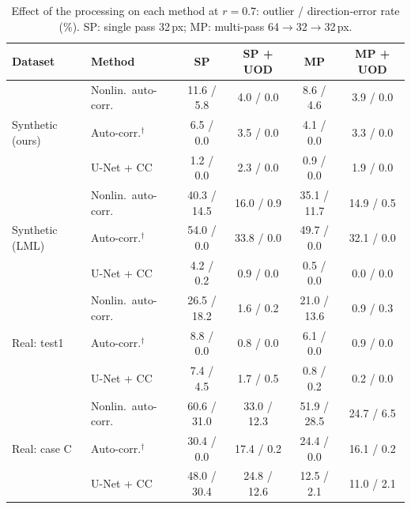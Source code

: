 \begin{table}[t]
\centering
\caption{Effect of the processing on each method at $r=0.7$: outlier / direction-error rate (\%). SP: single pass 32\,px; MP: multi-pass 64$\to$32$\to$32\,px.}
\label{tab:process}
\small
\begin{tabular}{llcccc}
\toprule
Dataset & Method & SP & SP + UOD & MP & MP + UOD \\
\midrule
\multirow{3}{*}{Synthetic (ours)} & Nonlin.\ auto-corr. & 11.6 / 5.8 & 4.0 / 0.0 & 8.6 / 4.6 & 3.9 / 0.0 \\
 & Auto-corr.$^\dagger$ & 6.5 / 0.0 & 3.5 / 0.0 & 4.1 / 0.0 & 3.3 / 0.0 \\
 & U-Net + CC & 1.2 / 0.0 & 2.3 / 0.0 & 0.9 / 0.0 & 1.9 / 0.0 \\
\midrule
\multirow{3}{*}{Synthetic (LML)} & Nonlin.\ auto-corr. & 40.3 / 14.5 & 16.0 / 0.9 & 35.1 / 11.7 & 14.9 / 0.5 \\
 & Auto-corr.$^\dagger$ & 54.0 / 0.0 & 33.8 / 0.0 & 49.7 / 0.0 & 32.1 / 0.0 \\
 & U-Net + CC & 4.2 / 0.2 & 0.9 / 0.0 & 0.5 / 0.0 & 0.0 / 0.0 \\
\midrule
\multirow{3}{*}{Real: test1} & Nonlin.\ auto-corr. & 26.5 / 18.2 & 1.6 / 0.2 & 21.0 / 13.6 & 0.9 / 0.3 \\
 & Auto-corr.$^\dagger$ & 8.8 / 0.0 & 0.8 / 0.0 & 6.1 / 0.0 & 0.9 / 0.0 \\
 & U-Net + CC & 7.4 / 4.5 & 1.7 / 0.5 & 0.8 / 0.2 & 0.2 / 0.0 \\
\midrule
\multirow{3}{*}{Real: case C} & Nonlin.\ auto-corr. & 60.6 / 31.0 & 33.0 / 12.3 & 51.9 / 28.5 & 24.7 / 6.5 \\
 & Auto-corr.$^\dagger$ & 30.4 / 0.0 & 17.4 / 0.2 & 24.4 / 0.0 & 16.1 / 0.2 \\
 & U-Net + CC & 48.0 / 30.4 & 24.8 / 12.6 & 12.5 / 2.1 & 11.0 / 2.1 \\
\bottomrule
\end{tabular}
\end{table}
